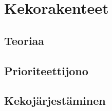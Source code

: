 \chapter{Kekorakenteet}

\section{Teoriaa}

\section{Prioriteettijono}

\section{Kekojärjestäminen}
